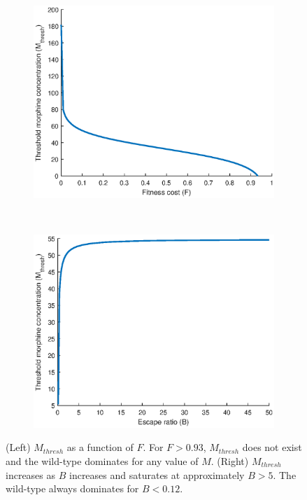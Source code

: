 \documentclass[11pt, oneside]{article}    %
\begin{document}
\begin{figure}[h]
    \centering
    \begin{subfigure}[b]{0.5\textwidth}
        \centering
        \includegraphics[scale=0.6]{M_thresh_F.eps}
    \end{subfigure}%
    ~ 
    \begin{subfigure}[b]{0.5\textwidth}
        \centering
        \includegraphics[scale=0.6]{M_thresh_B.eps}
    \end{subfigure}
    \caption{(Left) $M_{thresh}$ as a function of $F$. For $F>0.93$, $M_{thresh}$ does not exist and the wild-type dominates for any value of $M$. (Right) $M_{thresh}$ increases as $B$ increases and saturates at approximately $B>5$. The wild-type always dominates for $B<0.12$.}
\label{fig:M_thresh_F_B}
\end{figure}
\end{document}
